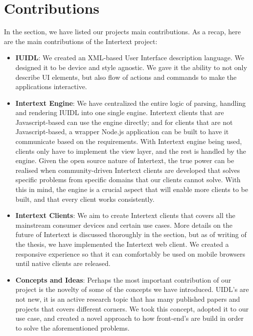 \section{Contributions}

In the  section, we have listed our projects main contributions. As a recap, here are the main contributions of the Intertext project:

\begin{itemize}
    
    \item \textbf{IUIDL}: We created an XML-based User Interface description language. We designed it to be device and style agnostic. We gave it the ability to not only describe UI elements, but also flow of actions and commands to make the applications interactive.
    
    \item \textbf{Intertext Engine}: We have centralized the entire logic of parsing, handling and rendering IUIDL into one single engine. Intertext clients that are Javascript-based can use the engine directly; and for clients that are not Javascript-based, a wrapper Node.js application can be built to have it communicate based on the requirements. With Intertext engine being used, clients only have to implement the view layer, and the rest is handled by the engine. Given the open source nature of Intertext, the true power can be realised when community-driven Intertext clients are developed that solves specific problems from specific domains that our clients cannot solve. With this in mind, the engine is a crucial aspect that will enable more clients to be built, and that every client works consistently. 
    
    \item \textbf{Intertext Clients}: We aim to create Intertext clients that covers all the mainstream consumer devices and certain use cases. More details on the future of Intertext is discussed thoroughly in the  section, but as of writing of the thesis, we have implemented the Intertext web client. We created a responsive experience so that it can comfortably be used on mobile browsers until native clients are released.
    
    \item \textbf{Concepts and Ideas}: Perhaps the most important contribution of our project is the novelty of some of the concepts we have introduced. UIDL's are not new, it is an active research topic that has many published papers and projects that covers different corners. We took this concept, adopted it to our use case, and created a novel approach to how front-end's are build in order to solve the aforementioned problems.

\end{itemize}


